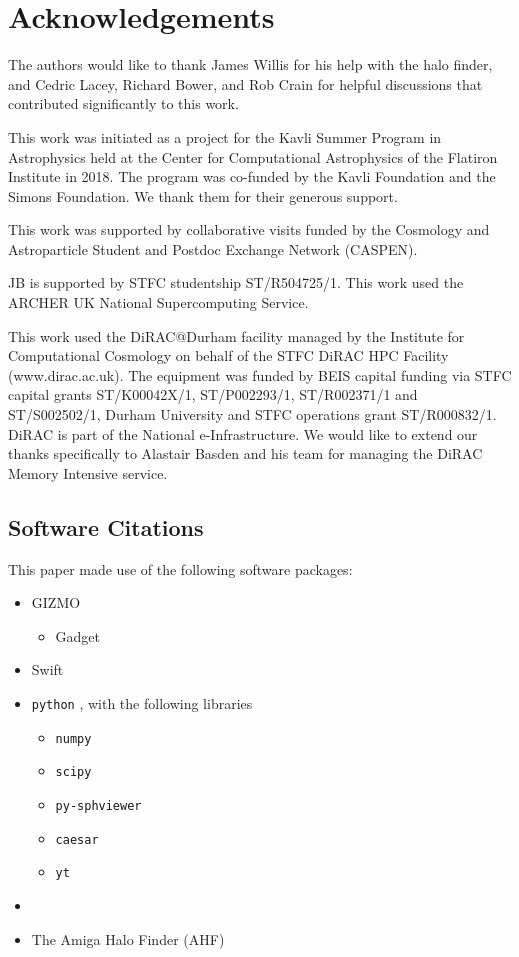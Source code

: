\section{Acknowledgements}
\label{sec:acknowledgements}

The authors would like to thank James Willis for his help with the
\velociraptor{} halo finder, and Cedric Lacey, Richard Bower, and Rob Crain
for helpful discussions that contributed significantly to this work.

This work was initiated as a project for the Kavli Summer Program in
Astrophysics held at the Center for Computational Astrophysics of the
Flatiron Institute in 2018. The program was co-funded by the Kavli Foundation
and the Simons Foundation. We thank them for their generous support.

This work was supported by collaborative visits funded by the Cosmology and
Astroparticle Student and Postdoc Exchange Network (CASPEN).

JB is supported by STFC studentship ST/R504725/1. This work used the ARCHER
UK National Supercomputing Service.

This work used the DiRAC@Durham facility managed by the Institute for
Computational Cosmology on behalf of the STFC DiRAC HPC Facility
(www.dirac.ac.uk). The equipment was funded by BEIS capital funding via STFC
capital grants ST/K00042X/1, ST/P002293/1, ST/R002371/1 and ST/S002502/1,
Durham University and STFC operations grant ST/R000832/1. DiRAC is part of
the National e-Infrastructure. We would like to extend our thanks specifically
to Alastair Basden and his team for managing the DiRAC Memory Intensive service. 

\subsection{Software Citations}

This paper made use of the following software packages:
\begin{itemize}
    \item GIZMO \citep{Hopkins2017}
        \begin{itemize}
            \item Gadget \citep{Springel2005b}
        \end{itemize}
    \item {\sc Swift} \citep{Schaller2016}
    \item {\tt python} \citep{Rossum1995}, with the following libraries
    \begin{itemize}
    	\item {\tt numpy} \citep{Numpy2006}
    	\item {\tt scipy} \citep{Scipy2001}
    	\item {\tt py-sphviewer} \citep{Benitez-Llambay2015}
    	\item {\tt caesar} \citep{Thompson2018}
    	\item {\tt yt} \citep{Turk2011}
    \end{itemize}
    \item \velociraptor{} \citep{Elahi2019}
    \item The Amiga Halo Finder (AHF) \citep{Gill2004, Knollmann2009}
\end{itemize}


